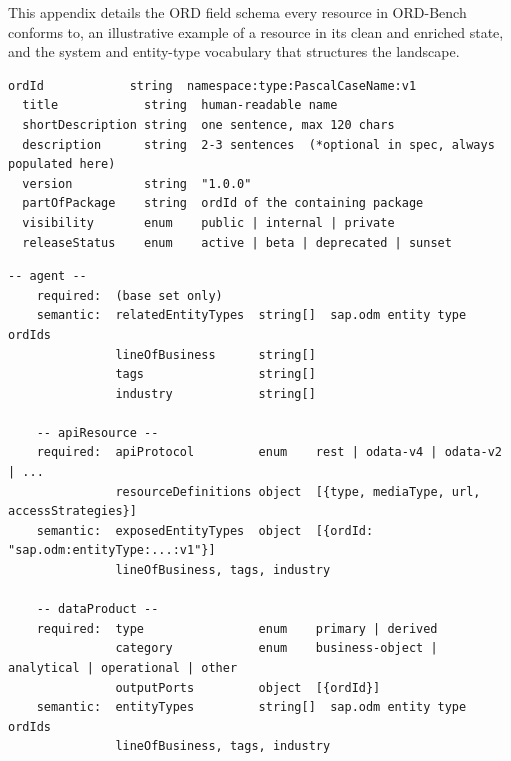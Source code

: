 This appendix details the ORD field schema every resource in ORD-Bench conforms to, an illustrative example of a resource in its clean and enriched state, and the system and entity-type vocabulary that structures the landscape.


\begin{lstlisting}[float=!t, floatplacement=!t, basicstyle=\ttfamily\scriptsize, breaklines=true, frame=single, label={lst:base_fields}, caption={Base required fields shared by all three resource types (agent, apiResource, dataProduct). \texttt{description} is optional per ORD v1.16 but always generated in this benchmark (273/273 resources).}]
  ordId            string  namespace:type:PascalCaseName:v1
  title            string  human-readable name
  shortDescription string  one sentence, max 120 chars
  description      string  2-3 sentences  (*optional in spec, always populated here)
  version          string  "1.0.0"
  partOfPackage    string  ordId of the containing package
  visibility       enum    public | internal | private
  releaseStatus    enum    active | beta | deprecated | sunset
  \end{lstlisting}
  
  \begin{lstlisting}[float=!t, floatplacement=!t, basicstyle=\ttfamily\scriptsize, breaklines=true, frame=single, label={lst:type_fields}, caption={Resource-specific required and semantic fields (Clean-ORD state). Semantic fields are optional in the ORD spec but always populated in the benchmark because they drive five of the six ambiguity-metric dimensions.}]
    -- agent --
    required:  (base set only)
    semantic:  relatedEntityTypes  string[]  sap.odm entity type ordIds
               lineOfBusiness      string[]
               tags                string[]
               industry            string[]
    
    -- apiResource --
    required:  apiProtocol         enum    rest | odata-v4 | odata-v2 | ...
               resourceDefinitions object  [{type, mediaType, url, accessStrategies}]
    semantic:  exposedEntityTypes  object  [{ordId: "sap.odm:entityType:...:v1"}]
               lineOfBusiness, tags, industry
    
    -- dataProduct --
    required:  type                enum    primary | derived
               category            enum    business-object | analytical | operational | other
               outputPorts         object  [{ordId}]
    semantic:  entityTypes         string[]  sap.odm entity type ordIds
               lineOfBusiness, tags, industry
    \end{lstlisting}


